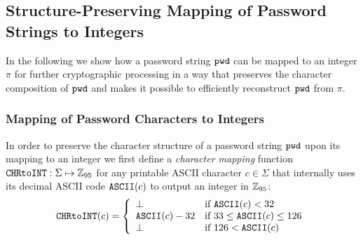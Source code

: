 \subsection{Structure-Preserving Mapping of Password Strings to Integers}\label{sec:pwdencoding}
In the following we show how a password string $\mathtt{pwd}$ can be mapped to an integer $\pi$ for further cryptographic processing in a way that preserves the character composition of $\mathtt{pwd}$ and makes it possible to efficiently reconstruct $\mathtt{pwd}$ from $\pi$. 


\subsubsection{Mapping of Password Characters to Integers}
In order to preserve the character structure of a password string $\mathtt{pwd}$ upon its mapping to an integer we first define a \emph{character mapping} function $\texttt{CHRtoINT}:\Sigma\mapsto\mathbb{Z}_{95}$ for any printable ASCII character $c\in\Sigma$ that internally uses its decimal ASCII code $\mathtt{ASCII}(c)$ to output an integer in $\mathbb{Z}_{95}$:
\[
\texttt{CHRtoINT}(c) =
\left\{
	\begin{array}{ll}
		\bot  & \mbox{if } \mathtt{ASCII}(c) < 32 \\
		\mathtt{ASCII}(c)-32 & \mbox{if } 33 \leq \mathtt{ASCII}(c) \leq 126 \\
		\bot & \mbox{if } 126 < \mathtt{ASCII}(c)
	\end{array}
\right.
\]


